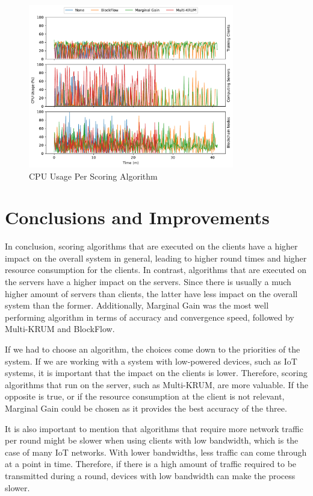 \begin{figure}[!hpb]
    \centering
    \centering
    \includegraphics[width=0.8\textwidth]{graphics/scoring/cpu.pdf}
    \caption{CPU Usage Per Scoring Algorithm}
    \label{fig:cpu_scoring}
\end{figure}

\vfill

\section{Conclusions and Improvements}

In conclusion, scoring algorithms that are executed on the clients have a higher impact on the overall system in general, leading to higher round times and higher resource consumption for the clients. In contrast, algorithms that are executed on the servers have a higher impact on the servers. Since there is usually a much higher amount of servers than clients, the latter have less impact on the overall system than the former. Additionally, Marginal Gain was the most well performing algorithm in terms of accuracy and convergence speed, followed by Multi-KRUM and BlockFlow.

If we had to choose an algorithm, the choices come down to the priorities of the system. If we are working with a system with low-powered devices, such as IoT systems, it is important that the impact on the clients is lower. Therefore, scoring algorithms that run on the server, such as Multi-KRUM, are more valuable. If the opposite is true, or if the resource consumption at the client is not relevant, Marginal Gain could be chosen as it provides the best accuracy of the three.

It is also important to mention that algorithms that require more network traffic per round might be slower when using clients with low bandwidth, which is the case of many IoT networks. With lower bandwidths, less traffic can come through at a point in time. Therefore, if there is a high amount of traffic required to be transmitted during a round, devices with low bandwidth can make the process slower.

